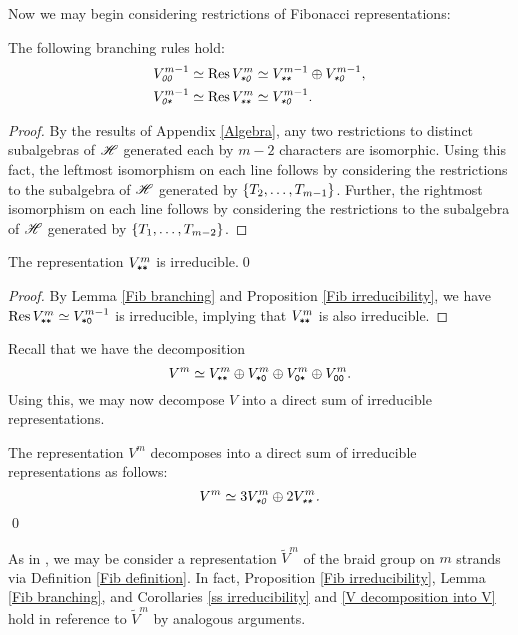 \documentclass{amsart}
\begin{document}
Now we may begin considering restrictions of Fibonacci representations:
\begin{lemma}\label{Fib branching}
  The following branching rules hold:
  \begin{align*}
    \emph{$V^{m-1}_{\texttt{0}\texttt{0}}$} \simeq \emph{$\operatorname{Res} V_{\texttt{*}\texttt{0}}^m$} &\simeq \emph{$V^{m-1}_{\texttt{*}\texttt{*}} \oplus V^{m-1}_{\texttt{*}\texttt{0}}$},\\
    \emph{$V_{\texttt{0}\texttt{*}}^{m-1} \simeq \operatorname{Res} V_{\texttt{*}\texttt{*}}^m$} &\simeq \emph{$V_{\texttt{*}\texttt{0}}^{m-1}$}.
  \end{align*}
\end{lemma}
\begin{proof}
  By the results of Appendix \ref{Algebra}, any two restrictions to distinct subalgebras of $\mathscr{H}$ generated each by $m-2$ characters are isomorphic.
  Using this fact, the leftmost isomorphism on each line follows by considering the restrictions to the subalgebra of $\mathscr{H}$ generated by $\left\{ T_2,\dots,T_{m-1} \right\}$.
  Further, the rightmost isomorphism on each line follows by considering the restrictions to the subalgebra of $\mathscr{H}$ generated by $\left\{ T_1,\dots,T_{m-2} \right\}$.
\end{proof}
\begin{corollary}\label{ss irreducibility}
  The representation \emph{$V^m_{\texttt{*}\texttt{*}}$} is irreducible.\qed
\end{corollary}
\begin{proof}
  By Lemma \ref{Fib branching} and Proposition \ref{Fib irreducibility}, we have $\operatorname{Res} V^m_{\texttt{*}\texttt{*}} \simeq V^{m-1}_{\texttt{*}\texttt{0}}$ is irreducible, implying that $V^m_{\texttt{*}\texttt{*}}$ is also irreducible.
\end{proof}
Recall that we have the decomposition
\[
  V^m \simeq V^m_{\texttt{*}\texttt{*}} \oplus V^m_{\texttt{*}\texttt{0}} \oplus V^m_{\texttt{0}\texttt{*}} \oplus V^m_{\texttt{0}\texttt{0}}.
\]
Using this, we may now decompose $V$ into a direct sum of irreducible representations.
\begin{corollary}\label{V decomposition into V}
  The representation $V^m$ decomposes into a direct sum of irreducible representations as follows:
  \[
    \emph{$V^m \simeq 3V^m_{\texttt{*}\texttt{0}} \oplus 2V^m_{\texttt{*}\texttt{*}}$.}
  \]\qed
\end{corollary}

\begin{remark}
  As in \cite{Shor}, we may be consider a representation $\tilde V^m$ of the braid group on $m$ strands via Definition \ref{Fib definition}. 
  In fact, Proposition \ref{Fib irreducibility}, Lemma \ref{Fib branching}, and Corollaries \ref{ss irreducibility} and \ref{V decomposition into V} hold in reference to $\tilde V^m$ by analogous arguments.
\end{remark}
\end{document}
